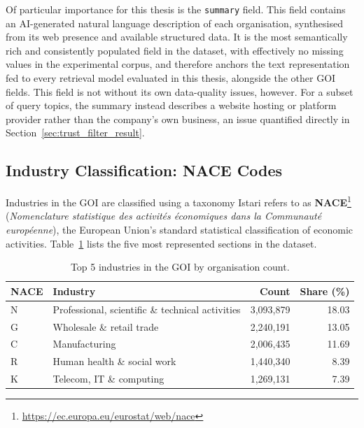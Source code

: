 \documentclass[a4paper,oneside,bibliography=totoc]{scrbook}
\begin{document}
Of particular importance for this thesis is the \texttt{summary} field. This field contains an AI-generated natural language description of each organisation, synthesised from its web presence and available structured data. It is the most semantically rich and consistently populated field in the dataset, with effectively no missing values in the experimental corpus, and therefore anchors the text representation fed to every retrieval model evaluated in this thesis, alongside the other GOI fields. This field is not without its own data-quality issues, however. For a subset of query topics, the summary instead describes a website hosting or platform provider rather than the company's own business, an issue quantified directly in Section~\ref{sec:trust_filter_result}.

\subsection{Industry Classification: NACE Codes}

Industries in the GOI are classified using a taxonomy Istari refers to as \textbf{NACE}\protect\footnote{\url{https://ec.europa.eu/eurostat/web/nace}} (\textit{Nomenclature statistique des activités économiques dans la Communauté européenne}), the European Union's standard statistical classification of economic activities. Table~\ref{tab:nace_top} lists the five most represented sections in the dataset.

\begin{table}[h]
\centering
\caption{Top 5 industries in the GOI by organisation count.}
\label{tab:nace_top}
\begin{tabular}{llrr}
\toprule
\textbf{NACE} & \textbf{Industry} & \textbf{Count} & \textbf{Share (\%)} \\
\midrule
N & Professional, scientific \& technical activities & 3{,}093{,}879 & 18.03 \\
G & Wholesale \& retail trade                        & 2{,}240{,}191 & 13.05 \\
C & Manufacturing                                    & 2{,}006{,}435 & 11.69 \\
R & Human health \& social work                      & 1{,}440{,}340 &  8.39 \\
K & Telecom, IT \& computing                         & 1{,}269{,}131 &  7.39 \\
\bottomrule
\end{tabular}
\end{table}
\end{document}
